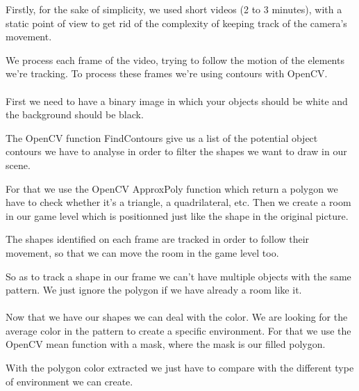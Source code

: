 \documentclass[landscape,final,a0paper,fontscale=0.285]{baposter}
\begin{document}
\begin{poster}
{  Firstly, for the sake of simplicity, we used short videos (2 to 3 minutes), with a static point of view to get rid of the complexity of keeping track of the camera's movement.
  
  We process each frame of the video, trying to follow the motion of the elements we're tracking. To process these frames we're using contours with OpenCV.
  \\
  \\
  \indent  
  First we need to have a binary image in which your objects should be white and the background should be black.
  
  The OpenCV function FindContours give us a list of the potential object contours we have to analyse in order to filter the shapes we want to draw in our scene.
  
  For that we use the OpenCV ApproxPoly function which return a polygon we have to check whether it's a triangle, a quadrilateral, etc. Then we create a room in our game level which is positionned just like the shape in the original picture.
  
  The shapes identified on each frame are tracked in order to follow their movement, so that we can move the room in the game level too.
  
  So as to track a shape in our frame we can't have multiple objects with the same pattern. We just ignore the polygon if we have already a room like it.
  \\
  \\
  \indent
  Now that we have our shapes we can deal with the color. We are looking for the average color in the pattern to create a specific environment. For that we use the OpenCV mean function with a mask, where the mask is our filled polygon.
  
  With the polygon color extracted we just have to compare with the different type of environment we can create.
  \\
  \\
  \indent
  
   \vspace{0.3em}
  }


\end{poster}
\end{document}
